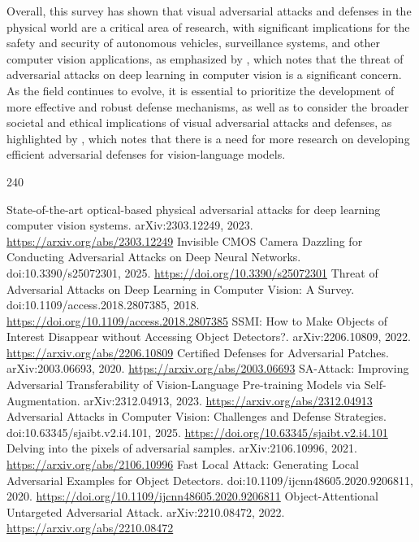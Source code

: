 \documentclass[11pt]{article}
\begin{document}
Overall, this survey has shown that visual adversarial attacks and defenses in the physical world are a critical area of research, with significant implications for the safety and security of autonomous vehicles, surveillance systems, and other computer vision applications, as emphasized by \cite{ref3}, which notes that the threat of adversarial attacks on deep learning in computer vision is a significant concern. As the field continues to evolve, it is essential to prioritize the development of more effective and robust defense mechanisms, as well as to consider the broader societal and ethical implications of visual adversarial attacks and defenses, as highlighted by \cite{ref159}, which notes that there is a need for more research on developing efficient adversarial defenses for vision-language models.


\begin{thebibliography}{240}
 State-of-the-art optical-based physical adversarial attacks for deep learning computer vision systems. arXiv:2303.12249, 2023. \url{https://arxiv.org/abs/2303.12249}
 Invisible CMOS Camera Dazzling for Conducting Adversarial Attacks on Deep Neural Networks. doi:10.3390/s25072301, 2025. \url{https://doi.org/10.3390/s25072301}
 Threat of Adversarial Attacks on Deep Learning in Computer Vision: A Survey. doi:10.1109/access.2018.2807385, 2018. \url{https://doi.org/10.1109/access.2018.2807385}
 SSMI: How to Make Objects of Interest Disappear without Accessing Object Detectors?. arXiv:2206.10809, 2022. \url{https://arxiv.org/abs/2206.10809}
 Certified Defenses for Adversarial Patches. arXiv:2003.06693, 2020. \url{https://arxiv.org/abs/2003.06693}
 SA-Attack: Improving Adversarial Transferability of Vision-Language Pre-training Models via Self-Augmentation. arXiv:2312.04913, 2023. \url{https://arxiv.org/abs/2312.04913}
 Adversarial Attacks in Computer Vision: Challenges and Defense Strategies. doi:10.63345/sjaibt.v2.i4.101, 2025. \url{https://doi.org/10.63345/sjaibt.v2.i4.101}
 Delving into the pixels of adversarial samples. arXiv:2106.10996, 2021. \url{https://arxiv.org/abs/2106.10996}
 Fast Local Attack: Generating Local Adversarial Examples for Object Detectors. doi:10.1109/ijcnn48605.2020.9206811, 2020. \url{https://doi.org/10.1109/ijcnn48605.2020.9206811}
 Object-Attentional Untargeted Adversarial Attack. arXiv:2210.08472, 2022. \url{https://arxiv.org/abs/2210.08472}

\end{thebibliography}
\end{document}
